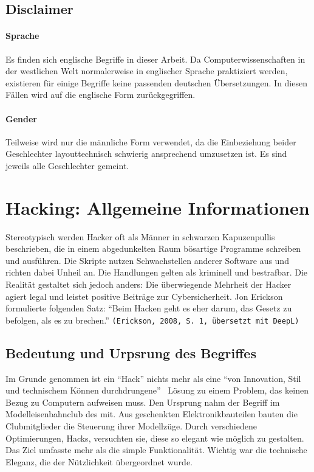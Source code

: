 \documentclass[11pt, a4paper]{article}
\begin{document}
\subsection{Disclaimer}
\paragraph{Sprache}
Es finden sich englische Begriffe in dieser Arbeit. Da Computerwissenschaften in der westlichen Welt normalerweise in englischer Sprache praktiziert werden, existieren für einige Begriffe keine passenden deutschen Übersetzungen. In diesen Fällen wird auf die englische Form zurückgegriffen.
\paragraph{Gender}
Teilweise wird nur die männliche Form verwendet, da die Einbeziehung beider Geschlechter layouttechnisch schwierig ansprechend umzusetzen ist. Es sind jeweils alle Geschlechter gemeint.

\newpage
\section{Hacking: Allgemeine Informationen}
Stereotypisch werden Hacker oft als Männer in schwarzen Kapuzenpullis beschrieben, die in einem abgedunkelten Raum bösartige Programme schreiben und ausführen. Die Skripte nutzen Schwachstellen anderer Software aus und richten dabei Unheil an. Die Handlungen gelten als kriminell und bestrafbar. Die Realität gestaltet sich jedoch anders: Die überwiegende Mehrheit der Hacker agiert legal und leistet positive Beiträge zur Cybersicherheit. Jon Erickson formulierte folgenden Satz: ``Beim Hacken geht es eher darum, das Gesetz zu befolgen, als es zu brechen.'' \texttt{(Erickson, 2008, S. 1, übersetzt mit DeepL)} \cite{erickson2008hacking}



\subsection{Bedeutung und Urpsrung des Begriffes}
Im Grunde genommen ist ein ``Hack'' nichts mehr als eine ``von Innovation, Stil und technischem Können durchdrungene''~\cite{bpbKleineGeschichte:online} Lösung zu einem Problem, das keinen Bezug zu Computern aufweisen muss. Den Ursprung nahm der Begriff im Modelleisenbahnclub des \gls{mit}. Aus geschenkten Elektronikbauteilen bauten die Clubmitglieder die Steuerung ihrer Modellzüge. Durch verschiedene Optimierungen, Hacks, versuchten sie, diese so elegant wie möglich zu gestalten. Das Ziel umfasste mehr als die simple Funktionalität. Wichtig war die technische Eleganz, die der Nützlichkeit übergeordnet wurde.
\end{document}
